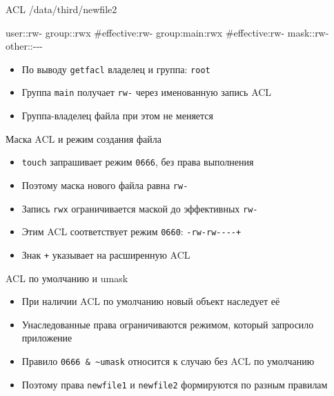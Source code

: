 \documentclass[
  ignorenonframetext,
  aspectratio=169,
  russian,
]{beamer}
\newenvironment{Shaded}{\begin{snugshade}}{\end{snugshade}}
\newcommand{\NormalTok}[1]{\textcolor[rgb]{0.00,0.23,0.31}{#1}}
\providecommand{\tightlist}{%
  \setlength{\itemsep}{0pt}\setlength{\parskip}{0pt}}
\begin{document}
\begin{frame}[fragile]{ACL /data/third/newfile2}
\protect{}\label{acl-datathirdnewfile2}
\begin{Shaded}
\begin{Highlighting}[]
\NormalTok{user::rw{-}}
\NormalTok{group::rwx       \#effective:rw{-}}
\NormalTok{group:main:rwx   \#effective:rw{-}}
\NormalTok{mask::rw{-}}
\NormalTok{other::{-}{-}{-}}
\end{Highlighting}
\end{Shaded}

\begin{itemize}
\tightlist
\item
  По выводу \texttt{getfacl} владелец и группа: \texttt{root}
\item
  Группа \texttt{main} получает \texttt{rw-} через именованную запись
  ACL
\item
  Группа-владелец файла при этом не меняется
\end{itemize}
\end{frame}

\begin{frame}[fragile]{Маска ACL и режим создания файла}
\protect{}\label{ux43cux430ux441ux43aux430-acl-ux438-ux440ux435ux436ux438ux43c-ux441ux43eux437ux434ux430ux43dux438ux44f-ux444ux430ux439ux43bux430}
\begin{itemize}
\tightlist
\item
  \texttt{touch} запрашивает режим \texttt{0666}, без права выполнения
\item
  Поэтому маска нового файла равна \texttt{rw-}
\item
  Запись \texttt{rwx} ограничивается маской до эффективных \texttt{rw-}
\item
  Этим ACL соответствует режим \texttt{0660}: \texttt{-rw-rw-\/-\/-\/-+}
\item
  Знак \texttt{+} указывает на расширенную ACL
\end{itemize}
\end{frame}

\begin{frame}[fragile]{ACL по умолчанию и umask}
\protect{}\label{acl-ux43fux43e-ux443ux43cux43eux43bux447ux430ux43dux438ux44e-ux438-umask}
\begin{itemize}
\tightlist
\item
  При наличии ACL по умолчанию новый объект наследует её
\item
  Унаследованные права ограничиваются режимом, который запросило
  приложение
\item
  Правило \texttt{0666\ \&\ \textasciitilde{}umask} относится к случаю
  без ACL по умолчанию
\item
  Поэтому права \texttt{newfile1} и \texttt{newfile2} формируются по
  разным правилам
\end{itemize}
\end{frame}
\end{document}
